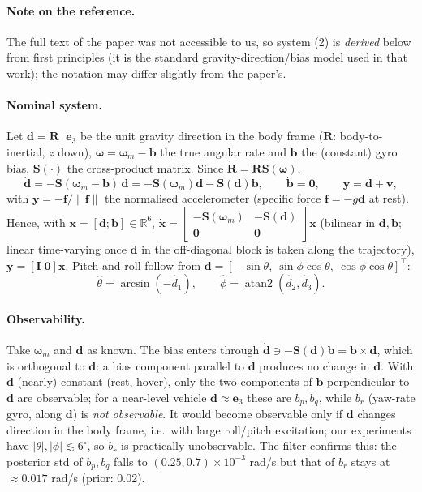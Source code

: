 \paragraph{Note on the reference.} The full text of the paper was not accessible to us, so system (2) is
\emph{derived} below from first principles (it is the standard gravity-direction/bias model used in that
work); the notation may differ slightly from the paper's.

\paragraph{Nominal system.} Let $\bm d=\bm R^\top \bm e_3$ be the unit gravity direction in the body frame
($\bm R$: body-to-inertial, $z$ down), $\bm\omega=\bm\omega_m-\bm b$ the true angular rate and $\bm b$ the
(constant) gyro bias, $\bm S(\cdot)$ the cross-product matrix. Since $\dot{\bm R}=\bm R\bm S(\bm\omega)$,
\begin{equation}
\dot{\bm d}=-\bm S(\bm\omega_m-\bm b)\,\bm d=-\bm S(\bm\omega_m)\bm d-\bm S(\bm d)\bm b,\qquad
\dot{\bm b}=\bm 0,\qquad \bm y=\bm d+\bm v,
\end{equation}
with $\bm y=-\bm f/\|\bm f\|$ the normalised accelerometer (specific force $\bm f=-g\bm d$ at rest).
Hence, with $\bm x=[\bm d;\bm b]\in\mathbb R^6$,
$\dot{\bm x}=\begin{bmatrix}-\bm S(\bm\omega_m) & -\bm S(\bm d)\\ \bm 0&\bm 0\end{bmatrix}\bm x$ (bilinear in
$\bm d,\bm b$; linear time-varying once $\bm d$ in the off-diagonal block is taken along the trajectory),
$\bm y=[\bm I\;\bm 0]\bm x$. Pitch and roll follow from $\bm d=[-\sin\theta,\ \sin\phi\cos\theta,\ \cos\phi\cos\theta]^\top$:
\begin{equation}
\hat\theta=\arcsin(-\hat d_1),\qquad \hat\phi=\operatorname{atan2}(\hat d_2,\hat d_3).
\end{equation}

\paragraph{Observability.} Take $\bm\omega_m$ and $\bm d$ as known. The bias enters through $\dot{\bm d}\ni-\bm S(\bm d)\bm b=\bm b\times\bm d$, which is
orthogonal to $\bm d$: a bias component parallel to $\bm d$ produces no change in $\bm d$. With $\bm d$ (nearly) constant (rest, hover),
only the two components of $\bm b$ perpendicular to $\bm d$ are observable; for a near-level vehicle $\bm d\approx\bm e_3$ these are $b_p,b_q$, while $b_r$
(yaw-rate gyro, along $\bm d$) is \emph{not observable}. It would become observable only if $\bm d$ changes direction in the body frame, i.e.\ with large
roll/pitch excitation; our experiments have $|\theta|,|\phi|\lesssim6^\circ$, so $b_r$ is practically unobservable. The filter confirms this: the posterior std of $b_p,b_q$ falls to
$(0.25,0.7)\times10^{-3}$ rad/s but that of $b_r$ stays at $\approx0.017$ rad/s (prior: 0.02).

